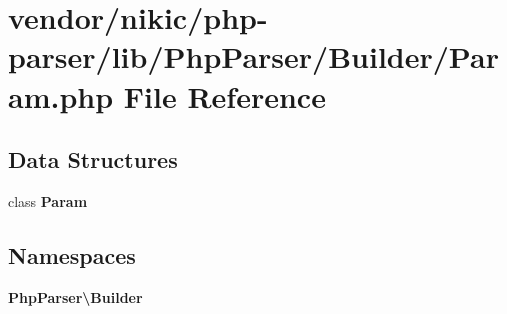 \section{vendor/nikic/php-\/parser/lib/\+Php\+Parser/\+Builder/\+Param.php File Reference}
\label{_builder_2_param_8php}
\subsection*{Data Structures}
\begin{DoxyCompactItemize}
\item 
class {\bf Param}
\end{DoxyCompactItemize}
\subsection*{Namespaces}
\begin{DoxyCompactItemize}
\item 
 {\bf Php\+Parser\textbackslash{}\+Builder}
\end{DoxyCompactItemize}
